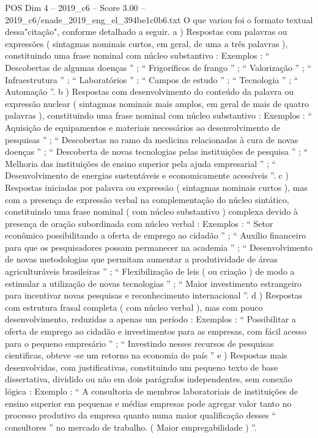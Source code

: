 \begin{textsample}{POS Dim 4 – 2019\_c6 – Score 3.00 – 2019\_c6/enade\_2019\_eng\_el\_394be1c0b6.txt}
O que variou foi o formato textual dessa"citação", conforme detalhado a seguir. a ) Respostas com palavras ou expressões ( sintagmas nominais curtos, em geral, de uma a três palavras ), constituindo uma frase nominal com núcleo substantivo : Exemplos : “ Descobertas de algumas doenças ” ; “ Frigoríficos de frango ” ; “ Valorização ” ; “ Infraestrutura ” ; “ Laboratórios ” ; “ Campos de estudo ” ; “ Tecnologia ” ; “ Automação ”. b ) Respostas com desenvolvimento do conteúdo da palavra ou expressão nuclear ( sintagmas nominais mais amplos, em geral de mais de quatro palavras ), constituindo uma frase nominal com núcleo substantivo : Exemplos : “ Aquisição de equipamentos e materiais necessários ao desenvolvimento de pesquisas ” ; “ Descobertas no ramo da medicina relacionadas à cura de novas doenças ” ; “ Descoberta de novas tecnologias pelas instituições de pesquisa ” ; “ Melhoria das instituições de ensino superior pela ajuda empresarial ” ; “ Desenvolvimento de energias sustentáveis e economicamente acessíveis ”. c ) Respostas iniciadas por palavra ou expressão ( sintagmas nominais curtos ), mas com a presença de expressão verbal na complementação do núcleo sintático, constituindo uma frase nominal ( com núcleo substantivo ) complexa devido à presença de oração subordinada com núcleo verbal : Exemplos : “ Setor econômico possibilitando a oferta de emprego ao cidadão ” ; “ Auxílio financeiro para que os pesquisadores possam permanecer na academia ” ; “ Desenvolvimento de novas metodologias que permitam aumentar a produtividade de áreas agriculturáveis brasileiras ” ; “ Flexibilização de leis ( ou criação ) de modo a estimular a utilização de novas tecnologias ” ; “ Maior investimento estrangeiro para incentivar novas pesquisas e reconhecimento internacional ”. d ) Respostas com estrutura frasal completa ( com núcleo verbal ), mas com pouco desenvolvimento, reduzidas a apenas um período : Exemplos : “ Possibilitar a oferta de emprego ao cidadão e investimentos para as empresas, com fácil acesso para o pequeno empresário ” ; “ Investindo nesses recursos de pesquisas cientificas, obteve -se um retorno na economia do país ” e ) Respostas mais desenvolvidas, com justificativas, constituindo um pequeno texto de base dissertativa, dividido ou não em dois parágrafos independentes, sem conexão lógica : Exemplo : “ A consultoria de membros laboratoriais de instituições de ensino superior em pequenas e médias empresas pode agregar valor tanto no processo produtivo da empresa quanto numa maior qualificação desses “ consultores ” no mercado de trabalho. ( Maior empregabilidade ) ”.

\end{textsample}
